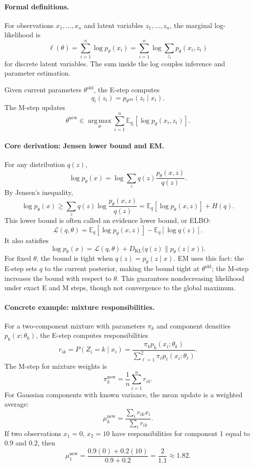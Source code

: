 \paragraph{Formal definitions.}
For observations \(x_1,\ldots,x_n\) and latent variables \(z_1,\ldots,z_n\), the marginal log-likelihood is
\[
\ell(\theta)=\sum_{i=1}^n \log p_\theta(x_i)
=\sum_{i=1}^n \log \sum_{z_i} p_\theta(x_i,z_i)
\]
for discrete latent variables. The sum inside the log couples inference and parameter estimation.

Given current parameters \(\theta^{\mathrm{old}}\), the E-step computes
\[
q_i(z_i)=p_{\theta^{\mathrm{old}}}(z_i\mid x_i).
\]
The M-step updates
\[
\theta^{\mathrm{new}}
\in
\operatorname*{arg\,max}_\theta
\sum_{i=1}^n
\mathbb E_{q_i}
\left[
\log p_\theta(x_i,z_i)
\right].
\]

\paragraph{Core derivation: Jensen lower bound and EM.}
For any distribution \(q(z)\),
\[
\log p_\theta(x)
=\log\sum_z q(z)\frac{p_\theta(x,z)}{q(z)}.
\]
By Jensen's inequality,
\[
\log p_\theta(x)
\geq
\sum_z q(z)\log\frac{p_\theta(x,z)}{q(z)}
=
\mathbb E_q[\log p_\theta(x,z)]
+H(q).
\]
This lower bound is often called an evidence lower bound, or ELBO:
\[
\mathcal L(q,\theta)
=\mathbb E_q[\log p_\theta(x,z)]-\mathbb E_q[\log q(z)].
\]
It also satisfies
\[
\boxed{
\log p_\theta(x)
=\mathcal L(q,\theta)
+D_{\mathrm{KL}}\bigl(q(z)\|p_\theta(z\mid x)\bigr).
}
\]
For fixed \(\theta\), the bound is tight when \(q(z)=p_\theta(z\mid x)\). EM uses this fact: the E-step sets \(q\) to the current posterior, making the bound tight at \(\theta^{\mathrm{old}}\); the M-step increases the bound with respect to \(\theta\). This guarantees nondecreasing likelihood under exact E and M steps, though not convergence to the global maximum.

\paragraph{Concrete example: mixture responsibilities.}
For a two-component mixture with parameters \(\pi_k\) and component densities \(p_k(x;\theta_k)\), the E-step computes responsibilities
\[
r_{ik}
=P(Z_i=k\mid x_i)
=
\frac{\pi_k p_k(x_i;\theta_k)}
{\sum_{\ell=1}^2 \pi_\ell p_\ell(x_i;\theta_\ell)}.
\]
The M-step for mixture weights is
\[
\pi_k^{\mathrm{new}}=\frac1n\sum_{i=1}^n r_{ik}.
\]
For Gaussian components with known variance, the mean update is a weighted average:
\[
\mu_k^{\mathrm{new}}
=
\frac{\sum_i r_{ik}x_i}{\sum_i r_{ik}}.
\]
If two observations \(x_1=0\), \(x_2=10\) have responsibilities for component 1 equal to \(0.9\) and \(0.2\), then
\[
\mu_1^{\mathrm{new}}
=\frac{0.9(0)+0.2(10)}{0.9+0.2}
=\frac{2}{1.1}
\approx1.82.
\]

